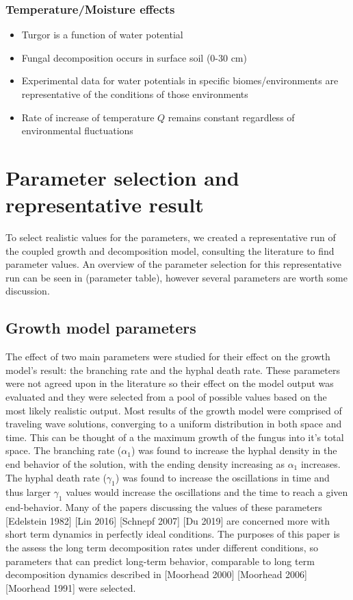 \documentclass[12pt]{article}
\begin{document}
\begin{multicols}{2}
\subsubsection{Temperature/Moisture effects}
\begin{itemize}
	\item Turgor is a function of water potential
	\item Fungal decomposition occurs in surface soil (0-30 cm)
	\item Experimental data for water potentials in specific biomes/environments are representative of the conditions of those environments
	\item Rate of increase of temperature $Q$ remains constant regardless of environmental fluctuations
\end{itemize}

\section*{Parameter selection and representative result}
To select realistic values for the parameters, we created a representative run of the coupled growth and decomposition model, consulting the literature to find parameter values. An overview of the parameter selection for this representative run can be seen in (parameter table), however several parameters are worth some discussion. 
\subsection*{Growth model parameters}
The effect of two main parameters were studied for their effect on the growth model's result: the branching rate and the hyphal death rate. These parameters were not agreed upon in the literature so their effect on the model output was evaluated and they were selected from a pool of possible values based on the most likely realistic output. Most results of the growth model were comprised of traveling wave solutions, converging to a uniform distribution in both space and time. This can be thought of a the maximum growth of the fungus into it's total space. The branching rate ($\alpha_{1}$) was found to increase the hyphal density in the end behavior of the solution, with the ending density increasing as $\alpha_{1}$ increases. The hyphal death rate ($\gamma_{1}$) was found to increase the oscillations in time and thus larger $\gamma_{1}$ values would increase the oscillations and the time to reach a given end-behavior. Many of the papers discussing the values of these parameters [Edelstein 1982] [Lin 2016] [Schnepf 2007] [Du 2019] are concerned more with short term dynamics in perfectly ideal conditions. The purposes of this paper is the assess the long term decomposition rates under different conditions, so parameters that can predict long-term behavior, comparable to long term decomposition dynamics described in [Moorhead 2000] [Moorhead 2006] [Moorhead 1991] were selected.

\end{multicols}
\end{document}
